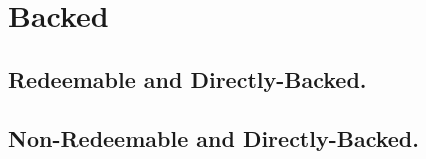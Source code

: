 



\section{Backed}


\subsection{Redeemable and Directly-Backed.}


\subsection{Non-Redeemable and Directly-Backed.}
%

